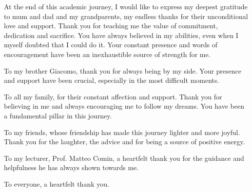 At the end of this academic journey, I would like to express my deepest gratitude to mum and dad and my grandparents, my endless thanks for their unconditional love and support. Thank you for teaching me the value of commitment, dedication and sacrifice. You have always believed in my abilities, even when I myself doubted that I could do it. Your constant presence and words of encouragement have been an inexhaustible source of strength for me.

To my brother Giacomo, thank you for always being by my side. Your presence and support have been crucial, especially in the most difficult moments.

To all my family, for their constant affection and support. Thank you for believing in me and always encouraging me to follow my dreams. You have been a fundamental pillar in this journey.

To my friends, whose friendship has made this journey lighter and more joyful. Thank you for the laughter, the advice and for being a source of positive energy.

To my lecturer, Prof. Matteo Comin, a heartfelt thank you for the guidance and helpfulness he has always shown towards me.\bigskip


To everyone, a heartfelt thank you.